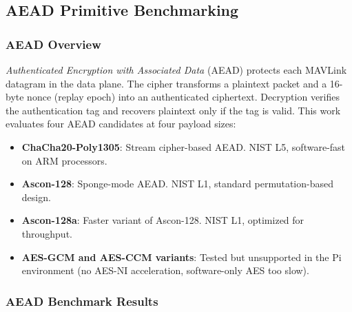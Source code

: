 \documentclass[conference]{IEEEtran}
\begin{document}
\subsection{AEAD Primitive Benchmarking}

\subsubsection{AEAD Overview}

\textit{Authenticated Encryption with Associated Data} (AEAD) protects each MAVLink datagram in the data plane. The cipher transforms a plaintext packet and a 16-byte nonce (replay epoch) into an authenticated ciphertext. Decryption verifies the authentication tag and recovers plaintext only if the tag is valid. This work evaluates four AEAD candidates at four payload sizes:

\begin{itemize}[leftmargin=*]
\item \textbf{ChaCha20-Poly1305}: Stream cipher-based AEAD. NIST L5, software-fast on ARM processors.
\item \textbf{Ascon-128}: Sponge-mode AEAD. NIST L1, standard permutation-based design.
\item \textbf{Ascon-128a}: Faster variant of Ascon-128. NIST L1, optimized for throughput.
\item \textbf{AES-GCM and AES-CCM variants}: Tested but unsupported in the Pi environment (no AES-NI acceleration, software-only AES too slow).
\end{itemize}

\subsubsection{AEAD Benchmark Results}
\end{document}
